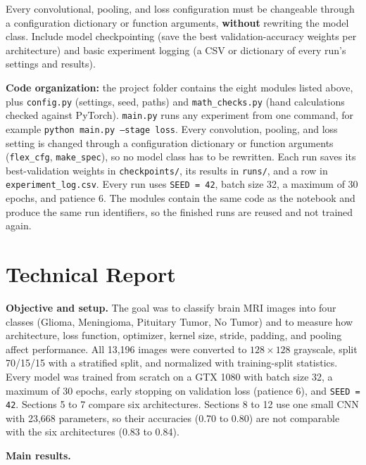 \documentclass[12pt,a4paper]{article}
\begin{document}
Every convolutional, pooling, and loss configuration must be changeable through a
configuration dictionary or function arguments, \textbf{without} rewriting the model
class. Include model checkpointing (save the best validation-accuracy weights per
architecture) and basic experiment logging (a CSV or dictionary of every run's
settings and results).

\begin{notebox}
\textbf{Code organization:} the project folder contains the eight modules listed above, plus \texttt{config.py}
(settings, seed, paths) and \texttt{math\_checks.py} (hand calculations checked against PyTorch).
\texttt{main.py} runs any experiment from one command, for example \texttt{python main.py --stage loss}.
Every convolution, pooling, and loss setting is changed through a configuration dictionary or function arguments
(\texttt{flex\_cfg}, \texttt{make\_spec}), so no model class has to be rewritten. Each run saves its
best-validation weights in \texttt{checkpoints/}, its results in \texttt{runs/}, and a row in
\texttt{experiment\_log.csv}. Every run uses \texttt{SEED = 42}, batch size 32, a maximum of 30 epochs, and
patience 6. The modules contain the same code as the notebook and produce the same run identifiers, so the
finished runs are reused and not trained again.
\end{notebox}

\section*{Technical Report}

\textbf{Objective and setup.} The goal was to classify brain MRI images into four classes (Glioma, Meningioma,
Pituitary Tumor, No Tumor) and to measure how architecture, loss function, optimizer, kernel size, stride,
padding, and pooling affect performance. All 13,196 images were converted to $128\times128$ grayscale, split
70/15/15 with a stratified split, and normalized with training-split statistics. Every model was trained from
scratch on a GTX 1080 with batch size 32, a maximum of 30 epochs, early stopping on validation loss (patience 6),
and \texttt{SEED = 42}. Sections 5 to 7 compare six architectures. Sections 8 to 12 use one small CNN with 23,668
parameters, so their accuracies (0.70 to 0.80) are not comparable with the six architectures (0.83 to 0.84).

\textbf{Main results.}
\end{document}

